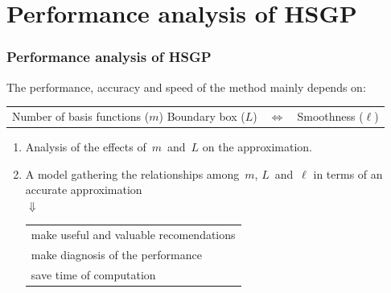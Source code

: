 \documentclass[8pt]{beamer} %
\newcommand{\tabitem}{%
  \usebeamertemplate{itemize item}\hspace*{\labelsep}}
\begin{document}
\section{Performance analysis of HSGP}
\begin{frame}\frametitle{\normalsize Performance analysis of HSGP}

The {\color{navyblue} performance}, {\color{navyblue} accuracy} and {\color{navyblue} speed} of the method mainly depends on:
%
\begin{center}
\begin{tabular}{ l l l}
 \pbox{5cm}{Number of basis functions ($m$) \\ Boundary box ($L$)} & $\Leftrightarrow$ & Smoothness ($\ell$)
\end{tabular}
\end{center}

\begin{tcolorbox}[colframe=blue!20, colback=white, title=Objectives, colbacktitle=lightblue, coltitle=black, boxrule=0.5pt]
\begin{enumerate}\setlength\itemsep{2mm}
\item Analysis of the effects of\, $m$\, and\, $L$ on the approximation.
\item A model gathering the relationships among\, $m$, $L$\, and\, $\ell$ in terms of an accurate approximation \\

 \centering $\Downarrow$
 \\[2mm]
 \begin{center}
 \begin{tabular}{@{}l@{}}
 \tabitem make useful and valuable {\color{navyblue} recomendations} \\
 \tabitem make {\color{navyblue} diagnosis} of the performance \\
 \tabitem save time of computation 
 \end{tabular}
 \end{center}
 
\end{enumerate}
\end{tcolorbox}
\end{frame}
\end{document}

